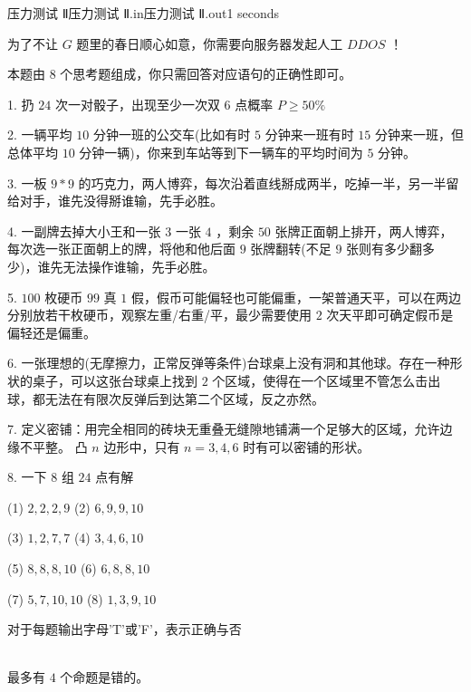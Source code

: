 \begin{problem}{压力测试 Ⅱ}{压力测试 Ⅱ.in}{压力测试 Ⅱ.out}{1 seconds}

为了不让 $G$ 题里的春日顺心如意，你需要向服务器发起人工 $DDOS$ ！

本题由 $8$ 个思考题组成，你只需回答对应语句的正确性即可。

1. 扔 $24$ 次一对骰子，出现至少一次双 $6$ 点概率 $P \geq 50\%$ 

2. 一辆平均 $10$ 分钟一班的公交车(比如有时 $5$ 分钟来一班有时 $15$ 分钟来一班，但总体平均 $10$ 分钟一辆)，你来到车站等到下一辆车的平均时间为 $5$ 分钟。

3. 一板 $9*9$ 的巧克力，两人博弈，每次沿着直线掰成两半，吃掉一半，另一半留给对手，谁先没得掰谁输，先手必胜。

4. 一副牌去掉大小王和一张 $3$ 一张 $4$ ，剩余 $50$ 张牌正面朝上排开，两人博弈，每次选一张正面朝上的牌，将他和他后面 $9$ 张牌翻转(不足 $9$ 张则有多少翻多少)，谁先无法操作谁输，先手必胜。

5. $100$ 枚硬币 $99$ 真 $1$ 假，假币可能偏轻也可能偏重，一架普通天平，可以在两边分别放若干枚硬币，观察左重/右重/平，最少需要使用 $2$ 次天平即可确定假币是偏轻还是偏重。

6. 一张理想的(无摩擦力，正常反弹等条件)台球桌上没有洞和其他球。存在一种形状的桌子，可以这张台球桌上找到 $2$ 个区域，使得在一个区域里不管怎么击出球，都无法在有限次反弹后到达第二个区域，反之亦然。

7. 定义密铺：用完全相同的砖块无重叠无缝隙地铺满一个足够大的区域，允许边缘不平整。
   凸 $n$ 边形中，只有 $n=3,4,6$ 时有可以密铺的形状。

8. 一下 $8$ 组 $24$ 点有解

   (1) $2,2,2,9$          (2) $6,9,9,10$
   
   (3) $1,2,7,7$          (4) $3,4,6,10$
   
   (5) $8,8,8,10$         (6) $6,8,8,10$
   
   (7) $5,7,10,10$        (8) $1,3,9,10$

\OutputFile

对于每题输出字母’T’或’F’，表示正确与否

\Example
\begin{example}
%
\end{example}
\\
最多有 $4$ 个命题是错的。
\end{problem}
